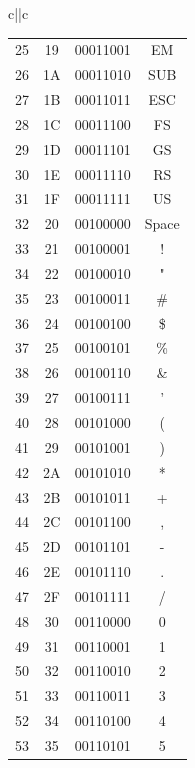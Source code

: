 \begin{table}[H]
{\begin{tabular}{c||c}
\begin{tabular}{cccc}
				25      & 19          & 00011001 & EM      \\
				26      & 1A          & 00011010 & SUB     \\
				27      & 1B          & 00011011 & ESC     \\
				28      & 1C          & 00011100 & FS      \\
				29      & 1D          & 00011101 & GS      \\
				30      & 1E          & 00011110 & RS      \\
				31      & 1F          & 00011111 & US      \\
				32      & 20          & 00100000 & Space   \\
				33      & 21          & 00100001 & !       \\
				34      & 22          & 00100010 & "       \\
				35      & 23          & 00100011 & \#      \\
				36      & 24          & 00100100 & \$      \\
				37      & 25          & 00100101 & \%      \\
				38      & 26          & 00100110 & \&      \\
				39      & 27          & 00100111 & '       \\
				40      & 28          & 00101000 & (       \\
				41      & 29          & 00101001 & )       \\
				42      & 2A          & 00101010 & *       \\
				43      & 2B          & 00101011 & +       \\
				44      & 2C          & 00101100 & ,       \\
				45      & 2D          & 00101101 & -       \\
				46      & 2E          & 00101110 & .       \\
				47      & 2F          & 00101111 & /       \\
				48      & 30          & 00110000 & 0       \\
				49      & 31          & 00110001 & 1       \\
				50      & 32          & 00110010 & 2       \\
				51      & 33          & 00110011 & 3       \\
				52      & 34          & 00110100 & 4       \\
				53      & 35          & 00110101 & 5       \\

\end{tabular}
\end{tabular}}
\end{table}
